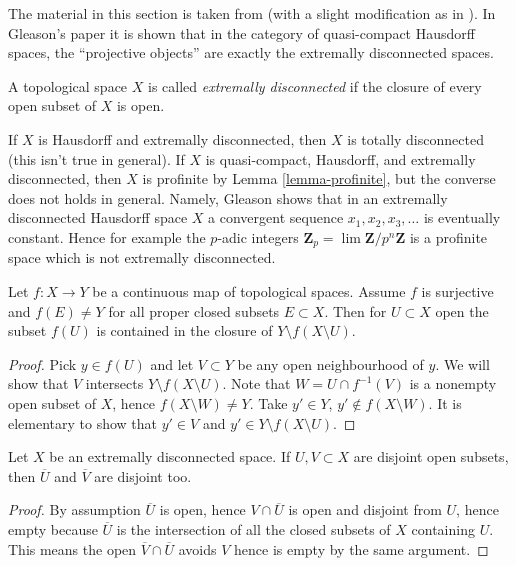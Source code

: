 \noindent
The material in this section is taken from \cite{Gleason}
(with a slight modification as in \cite{Rainwater}).
In Gleason's paper it is shown that in the category of quasi-compact
Hausdorff spaces, the ``projective objects'' are exactly the extremally
disconnected spaces.

\begin{definition}
\label{definition-extremally-disconnected}
A topological space $X$ is called {\it extremally disconnected}
if the closure of every open subset of $X$ is open.
\end{definition}

\noindent
If $X$ is Hausdorff and extremally disconnected, then $X$ is totally
disconnected (this isn't true in general). If $X$ is quasi-compact,
Hausdorff, and extremally disconnected, then $X$ is profinite by
Lemma \ref{lemma-profinite}, but the converse does not holds in general.
Namely, Gleason shows that in an extremally disconnected Hausdorff space $X$
a convergent sequence $x_1, x_2, x_3, \ldots$ is eventually constant.
Hence for example the $p$-adic integers
$\mathbf{Z}_p = \lim \mathbf{Z}/p^n\mathbf{Z}$ is a profinite space
which is not extremally disconnected.

\begin{lemma}
\label{lemma-image-open-technical}
Let $f : X \to Y$ be a continuous map of topological spaces.
Assume $f$ is surjective and $f(E) \not = Y$ for all proper
closed subsets $E \subset X$. Then for $U \subset X$ open the subset
$f(U)$ is contained in the closure of $Y \setminus f(X \setminus U)$.
\end{lemma}

\begin{proof}
Pick $y \in f(U)$ and let $V \subset Y$ be any open neighbourhood of $y$.
We will show that $V$ intersects $Y \setminus f(X \setminus U)$.
Note that $W = U \cap f^{-1}(V)$ is a nonempty open subset of $X$, hence
$f(X \setminus W) \not = Y$. Take $y' \in Y$, $y' \not \in f(X \setminus W)$.
It is elementary to show that $y' \in V$ and
$y' \in Y \setminus f(X \setminus U)$.
\end{proof}

\begin{lemma}
\label{lemma-intersection-empty}
Let $X$ be an extremally disconnected space.
If $U, V \subset X$ are disjoint open subsets, then
$\overline{U}$ and $\overline{V}$ are disjoint too.
\end{lemma}

\begin{proof}
By assumption $\overline{U}$ is open, hence $V \cap \overline{U}$
is open and disjoint from $U$, hence empty because $\overline{U}$
is the intersection of all the closed subsets of $X$ containing $U$.
This means the open $\overline{V} \cap \overline{U}$ avoids $V$
hence is empty by the same argument.
\end{proof}

